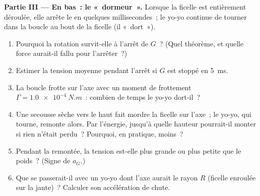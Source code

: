 \begin{problem}
\medskip
\noindent\textbf{Partie III --- En bas~: le «~dormeur~».}
Lorsque la ficelle est entièrement déroulée, elle arrête le  en quelques millisecondes~; le yo-yo continue de tourner dans la
boucle au bout de la ficelle (il «~dort~»).
\begin{enumerate}[resume]
  \item Pourquoi la rotation survit-elle à l'arrêt de $G$~? (Quel
        théorème, et quelle force aurait-il fallu pour l'arrêter~?)
  \item Estimer la tension moyenne pendant l'arrêt si $G$ est stoppé en
        \qty{5}{ms}.
  \item La boucle frotte sur l'axe avec un moment de frottement $\Gamma =
        \qty{1.0e-4}{N.m}$~: combien de temps le yo-yo dort-il~?
  \item Une secousse sèche vers le haut fait mordre la ficelle sur
        l'axe~; le yo-yo, qui tourne, remonte alors. Par l'énergie,
        jusqu'à quelle hauteur pourrait-il monter si rien n'était perdu~?
        Pourquoi, en pratique, moins~?
  \item Pendant la remontée, la tension est-elle plus grande ou plus
        petite que le poids~? (Signe de $a_G$.)
  \item Que se passerait-il avec un yo-yo dont l'axe aurait le rayon $R$
        (ficelle enroulée sur la jante)~? Calculer son accélération de chute.
\end{enumerate}


\end{problem}
